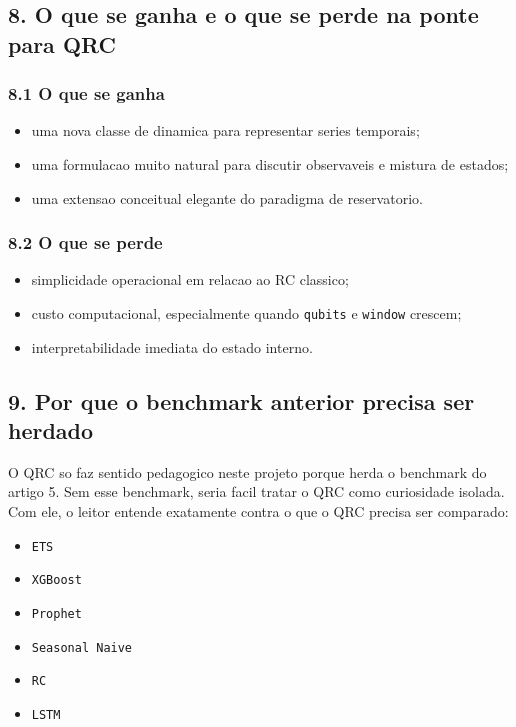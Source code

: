 \documentclass[12pt]{article}
\providecommand{\tightlist}{%
          \setlength{\itemsep}{0pt}\setlength{\parskip}{0pt}}
\begin{document}
\subsection{8. O que se ganha e o que se perde na ponte para QRC}\label{8-o-que-se-ganha-e-o-que-se-perde-na-ponte-para-qrc}

\subsubsection{8.1 O que se ganha}\label{81-o-que-se-ganha}

\begin{itemize}
\tightlist
\item
  uma nova classe de dinamica para representar series temporais;
\item
  uma formulacao muito natural para discutir observaveis e mistura de estados;
\item
  uma extensao conceitual elegante do paradigma de reservatorio.
\end{itemize}

\subsubsection{8.2 O que se perde}\label{82-o-que-se-perde}

\begin{itemize}
\tightlist
\item
  simplicidade operacional em relacao ao RC classico;
\item
  custo computacional, especialmente quando \texttt{qubits} e \texttt{window} crescem;
\item
  interpretabilidade imediata do estado interno.
\end{itemize}

\subsection{9. Por que o benchmark anterior precisa ser herdado}\label{9-por-que-o-benchmark-anterior-precisa-ser-herdado}

O QRC so faz sentido pedagogico neste projeto porque herda o benchmark do artigo 5. Sem esse benchmark, seria facil tratar o QRC como curiosidade isolada. Com ele, o leitor entende exatamente contra o que o QRC precisa ser comparado:

\begin{itemize}
\tightlist
\item
  \texttt{ETS}
\item
  \texttt{XGBoost}
\item
  \texttt{Prophet}
\item
  \texttt{Seasonal\ Naive}
\item
  \texttt{RC}
\item
  \texttt{LSTM}
\end{itemize}
\end{document}
